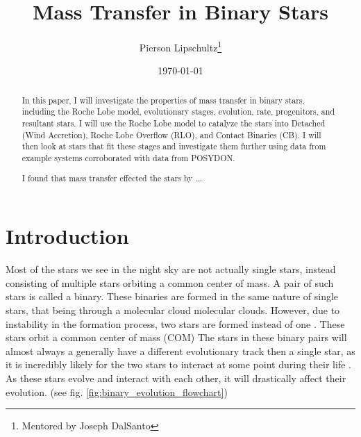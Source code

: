 \documentclass[12pt, a4paper]{article}
\title{Mass Transfer in Binary Stars}
\author{Pierson Lipschultz\thanks{Mentored by Joseph DalSanto}}
\date{\today}
\begin{document}
\maketitle
\begin{abstract}
    \normalsize
    In this paper, I will investigate the properties of mass transfer in binary stars, including the Roche Lobe model, evolutionary stages, evolution, rate, progenitors, and resultant stars. I will use the Roche Lobe model to catalyze the stars into Detached (Wind Accretion), Roche Lobe Overflow (RLO), and Contact Binaries (CB). I will then look at stars that fit these stages and investigate them further using data from example systems corroborated with data from POSYDON.

    I found that mass transfer effected the stars by ... 
\end{abstract}

\pagebreak

\section{\centering Introduction} %

    Most of the stars we see in the night sky are not actually single stars, instead consisting of multiple stars orbiting a common center of mass. A pair of such stars is called a binary. These binaries are formed in the same nature of single stars, that being through a molecular cloud molecular clouds. However, due to instability in the formation process, two stars are formed instead of one \cite{Offner_2016}. These stars orbit a common center of mass (COM)  The stars in these binary pairs will almost always a generally have a different evolutionary track then a single star, as it is incredibly likely for the two stars to interact at some point during their life \cite{Fabry_2025}. As these stars evolve and interact with each other, it will drastically affect their evolution. (see fig. \ref{fig:binary_evolution_flowchart})
\end{document}
